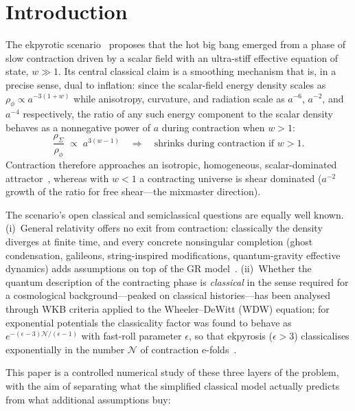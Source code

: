 \documentclass[11pt,a4paper]{article}
\newcommand{\rhophi}{\rho_\phi}
\newcommand{\rhoSigma}{\rho_\Sigma}
\begin{document}
\section{Introduction}

The ekpyrotic scenario~\cite{Khoury:2001wf} proposes that the hot big bang
emerged from a phase of slow contraction driven by a scalar field with an
ultra-stiff effective equation of state, $w\gg1$. Its central classical
claim is a smoothing mechanism that is, in a precise sense, dual to
inflation: since the scalar-field energy density scales as
$\rhophi\propto a^{-3(1+w)}$ while anisotropy, curvature, and radiation
scale as $a^{-6}$, $a^{-2}$, and $a^{-4}$ respectively, the ratio of any
such energy component to the scalar density behaves as a nonnegative power
of $a$ during contraction when $w>1$:
\begin{equation}
  \frac{\rhoSigma}{\rhophi}\;\propto\;a^{3(w-1)}
  \quad\Longrightarrow\quad
  \text{shrinks during contraction if } w>1 .
  \label{eq:smoothing}
\end{equation}
Contraction therefore approaches an isotropic, homogeneous,
scalar-dominated attractor~\cite{Erickson:2003zm}, whereas with $w<1$ a
contracting universe is shear dominated ($a^{-2}$ growth of the ratio for
free shear---the mixmaster direction).

The scenario's open classical and semiclassical questions are equally well
known. (i)~General relativity offers no exit from contraction: classically
the density diverges at finite time, and every concrete nonsingular
completion (ghost condensation, galileons, string-inspired modifications,
quantum-gravity effective dynamics) adds assumptions on top of the GR
model~\cite{Buchbinder:2007ad,Lehners:2008vx}. (ii)~Whether the quantum
description of the contracting phase is \emph{classical} in the sense
required for a cosmological background---peaked on classical
histories---has been analysed through WKB criteria applied to the
Wheeler--DeWitt (WDW) equation; for exponential potentials the
classicality factor was found to behave as
$e^{-(\epsilon-3)\mathcal{N}/(\epsilon-1)}$ with fast-roll parameter
$\epsilon$, so that ekpyrosis ($\epsilon>3$) classicalises exponentially in
the number $\mathcal N$ of contraction e-folds~\cite{Lehners:2015}.

This paper is a controlled numerical study of these three layers of the
problem, with the aim of separating what the simplified classical model
actually predicts from what additional assumptions buy:
\end{document}
